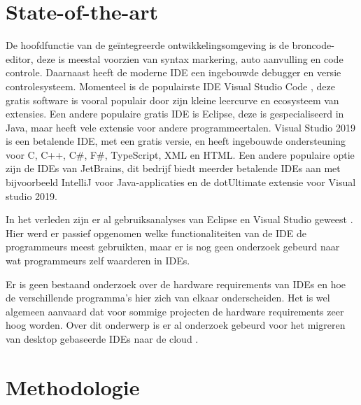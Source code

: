 
\section{State-of-the-art}
\label{sec:state-of-the-art}

De hoofdfunctie van de geïntegreerde ontwikkelingsomgeving is de broncode-editor, deze is meestal voorzien van syntax markering, auto aanvulling en code controle. Daarnaast heeft de moderne IDE een ingebouwde debugger en versie controlesysteem. Momenteel is de populairste IDE Visual Studio Code \autocite{StackOverflow2021}, deze gratis software is vooral populair door zijn kleine leercurve en ecosysteem van extensies. Een andere populaire gratis IDE is Eclipse, deze is gespecialiseerd in Java, maar heeft vele extensie voor andere programmeertalen. Visual Studio 2019 is een betalende IDE, met een gratis versie, en heeft ingebouwde ondersteuning voor C, C++, C\#, F\#, TypeScript, XML en HTML. Een andere populaire optie zijn de IDEs van JetBrains, dit bedrijf biedt meerder betalende IDEs aan met bijvoorbeeld IntelliJ voor Java-applicaties en de dotUltimate extensie voor Visual studio 2019.

In het verleden zijn er al gebruiksanalyses van Eclipse en Visual Studio geweest \autocite{Murphy2006, Amann2016}. Hier werd er passief opgenomen welke functionaliteiten van de IDE de programmeurs meest gebruikten, maar er is nog geen onderzoek gebeurd naar wat programmeurs zelf waarderen in IDEs. 

Er is geen bestaand onderzoek over de hardware requirements van IDEs en hoe de verschillende programma’s hier zich van elkaar onderscheiden. Het is wel algemeen aanvaard dat voor sommige projecten de hardware requirements zeer hoog worden. Over dit onderwerp is er al onderzoek gebeurd voor het migreren van desktop gebaseerde IDEs naar de cloud \autocite{Devadiga2021}.



\section{Methodologie}
\label{sec:methodologie}

